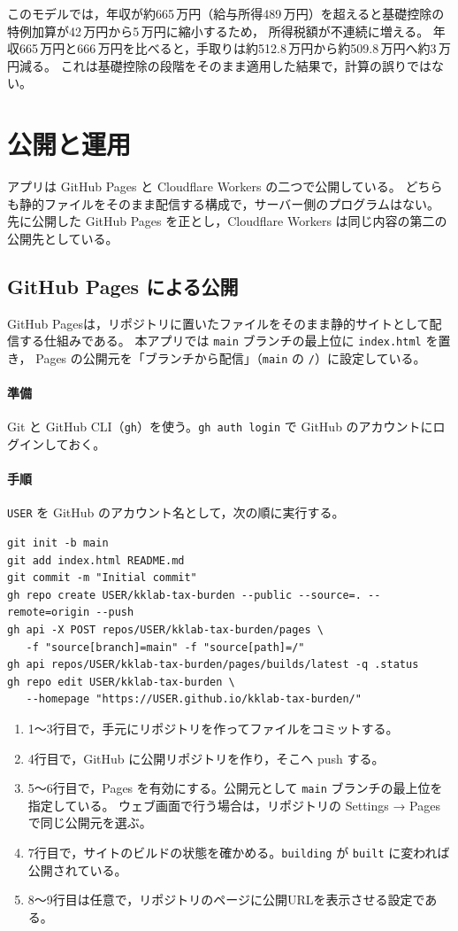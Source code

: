 \documentclass[paper=a4,fontsize=10pt]{jlreq}
\newcommand{\code}[1]{\texttt{#1}}
\newcommand{\man}{\,万円}
\begin{document}
このモデルでは，年収が約665\man（給与所得489\man）を超えると基礎控除の特例加算が42\man から5\man に縮小するため，
所得税額が不連続に増える。
年収665\man と666\man を比べると，手取りは約512.8\man から約509.8\man へ約3\man 減る。
これは基礎控除の段階\cite{nta}をそのまま適用した結果で，計算の誤りではない。

\section{公開と運用}\label{sec:hosting}

アプリは GitHub Pages と Cloudflare Workers の二つで公開している。
どちらも静的ファイルをそのまま配信する構成で，サーバー側のプログラムはない。
先に公開した GitHub Pages を正とし，Cloudflare Workers は同じ内容の第二の公開先としている。

\subsection{GitHub Pages による公開}

GitHub Pages\cite{ghpages}は，リポジトリに置いたファイルをそのまま静的サイトとして配信する仕組みである。
本アプリでは \code{main} ブランチの最上位に \code{index.html} を置き，
Pages の公開元を「ブランチから配信」（\code{main} の \code{/}）に設定している。

\paragraph{準備}
Git と GitHub CLI（\code{gh}）を使う。\code{gh auth login} で GitHub のアカウントにログインしておく。

\paragraph{手順}
\code{USER} を GitHub のアカウント名として，次の順に実行する。
\begin{lstlisting}
git init -b main
git add index.html README.md
git commit -m "Initial commit"
gh repo create USER/kklab-tax-burden --public --source=. --remote=origin --push
gh api -X POST repos/USER/kklab-tax-burden/pages \
   -f "source[branch]=main" -f "source[path]=/"
gh api repos/USER/kklab-tax-burden/pages/builds/latest -q .status
gh repo edit USER/kklab-tax-burden \
   --homepage "https://USER.github.io/kklab-tax-burden/"
\end{lstlisting}
\begin{enumerate}
  \item 1〜3行目で，手元にリポジトリを作ってファイルをコミットする。
  \item 4行目で，GitHub に公開リポジトリを作り，そこへ push する。
  \item 5〜6行目で，Pages を有効にする。公開元として \code{main} ブランチの最上位を指定している。
    ウェブ画面で行う場合は，リポジトリの Settings → Pages で同じ公開元を選ぶ。
  \item 7行目で，サイトのビルドの状態を確かめる。\code{building} が \code{built} に変われば公開されている。
  \item 8〜9行目は任意で，リポジトリのページに公開URLを表示させる設定である。
\end{enumerate}
\end{document}
